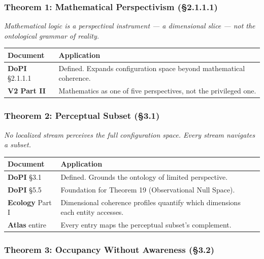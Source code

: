 \subsubsection*{Theorem 1: Mathematical Perspectivism (§2.1.1.1)}


\textit{Mathematical logic is a perspectival instrument — a dimensional slice — not the ontological grammar of reality.}



\begin{longtable}{>{\raggedright\arraybackslash}p{} >{\raggedright\arraybackslash}p{}}
\toprule
\textbf{Document} & \textbf{Application} \\
\midrule
\endhead
\textbf{DoPI} §2.1.1.1 & Defined. Expands configuration space beyond mathematical coherence. \\
\textbf{V2 Part II} & Mathematics as one of five perspectives, not the privileged one. \\
\bottomrule
\end{longtable}



\subsubsection*{Theorem 2: Perceptual Subset (§3.1)}


\textit{No localized stream perceives the full configuration space. Every stream navigates a subset.}



\begin{longtable}{>{\raggedright\arraybackslash}p{} >{\raggedright\arraybackslash}p{}}
\toprule
\textbf{Document} & \textbf{Application} \\
\midrule
\endhead
\textbf{DoPI} §3.1 & Defined. Grounds the ontology of limited perspective. \\
\textbf{DoPI} §5.5 & Foundation for Theorem 19 (Observational Null Space). \\
\textbf{Ecology} Part I & Dimensional coherence profiles quantify which dimensions each entity accesses. \\
\textbf{Atlas} entire & Every entry maps the perceptual subset's complement. \\
\bottomrule
\end{longtable}



\subsubsection*{Theorem 3: Occupancy Without Awareness (§3.2)}


